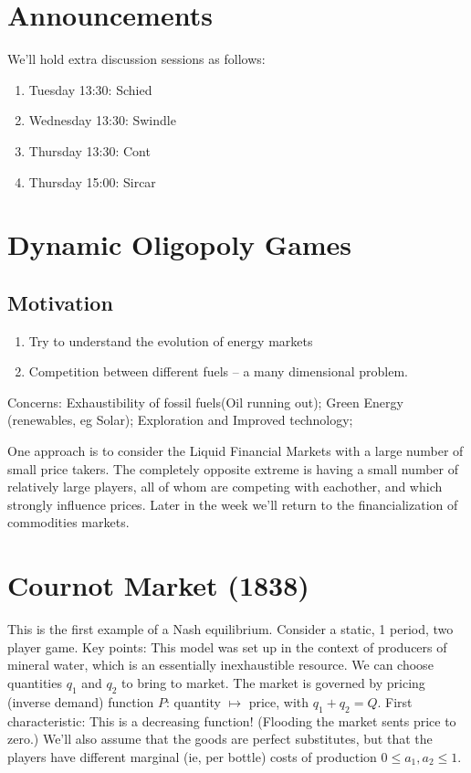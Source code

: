 \section{Announcements}
We'll hold extra discussion sessions as follows:
\begin{enumerate}
	\item Tuesday 13:30: Schied
	\item Wednesday 13:30: Swindle
	\item Thursday 13:30: Cont
	\item Thursday 15:00: Sircar
\end{enumerate}

\section{Dynamic Oligopoly Games}
\subsection{Motivation}
\begin{enumerate}
	\item Try to understand the evolution of energy markets
	\item Competition between different fuels -- a many dimensional problem.
\end{enumerate}
Concerns: Exhaustibility of fossil fuels(Oil running out); Green Energy (renewables, eg Solar); Exploration and Improved technology; 

One approach is to consider the Liquid Financial Markets with a large number of small price takers. The completely opposite extreme is having a small number of relatively large players, all of whom are competing with eachother, and which strongly influence prices. Later in the week we'll return to the financialization of commodities markets.

\section{Cournot Market (1838)}
This is the first example of a Nash equilibrium.
Consider a static, 1 period, two player game.
Key points: This model was set up in the context of producers of mineral water, which is an essentially inexhaustible resource. We can choose quantities $q_1$ and $q_2$ to bring to market. The market is governed by pricing (inverse demand) function $P$: quantity $\mapsto$ price, with $q_1+q_2=Q$. First characteristic: This is a decreasing function! (Flooding the market sents price to zero.) We'll also assume that the goods are perfect substitutes, but that the players have different marginal (ie, per bottle) costs of production $0\leq a_1, a_2 \leq 1$. 

